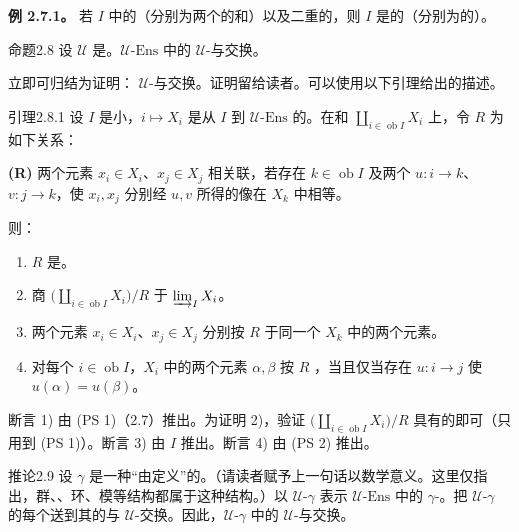 \textbf{例 2.7.1。} 若 $I$ 中的（分别为两个的和）以及二重的，则 $I$ 是的（分别为的）。
\begin{SGAresult}{命题}{2.8}
设 $\mathcal U$ 是。$\mathcal U\text{-}\mathrm{Ens}$ 中的 $\mathcal U$-与交换。
\end{SGAresult}
立即可归结为证明： $\mathcal U$-与交换。证明留给读者。可以使用以下引理给出的描述。
\begin{SGAresult}{引理}{2.8.1}
设 $I$ 是小，$i\mapsto X_i$ 是从 $I$ 到 $\mathcal U\text{-}\mathrm{Ens}$ 的。在和 $\coprod_{i\in\operatorname{ob}I}X_i$ 上，令 $R$ 为如下关系：

\textbf{(R)} 两个元素 $x_i\in X_i$、$x_j\in X_j$ 相关联，若存在 $k\in\operatorname{ob}I$ 及两个 $u:i\to k$、$v:j\to k$，使 $x_i,x_j$ 分别经 $u,v$ 所得的像在 $X_k$ 中相等。

则：
\begin{enumerate}
\item $R$ 是。
\item 商 $\bigl(\coprod_{i\in\operatorname{ob}I}X_i\bigr)/R$ 于 $\varinjlim_I X_i$。
\item 两个元素 $x_i\in X_i$、$x_j\in X_j$ 分别按 $R$ 于同一个 $X_k$ 中的两个元素。
\item 对每个 $i\in\operatorname{ob}I$，$X_i$ 中的两个元素 $\alpha,\beta$ 按 $R$ ，当且仅当存在 $u:i\to j$ 使 $u(\alpha)=u(\beta)$。
\end{enumerate}
\end{SGAresult}
断言 1) 由 (PS 1)（2.7）推出。为证明 2)，验证 $\bigl(\coprod_{i\in\operatorname{ob}I}X_i\bigr)/R$ 具有的即可（只用到 (PS 1)）。断言 3) 由 $I$ 推出。断言 4) 由 (PS 2) 推出。
\begin{SGAresult}{推论}{2.9}
设 $\gamma$ 是一种“由定义”的。（请读者赋予上一句话以数学意义。这里仅指出，群、、环、模等结构都属于这种结构。）以 $\mathcal U\text{-}\gamma$ 表示 $\mathcal U\text{-}\mathrm{Ens}$ 中的 $\gamma$-。把 $\mathcal U\text{-}\gamma$ 的每个送到其的与 $\mathcal U$-交换。因此，$\mathcal U\text{-}\gamma$ 中的 $\mathcal U$-与交换。
\end{SGAresult}
